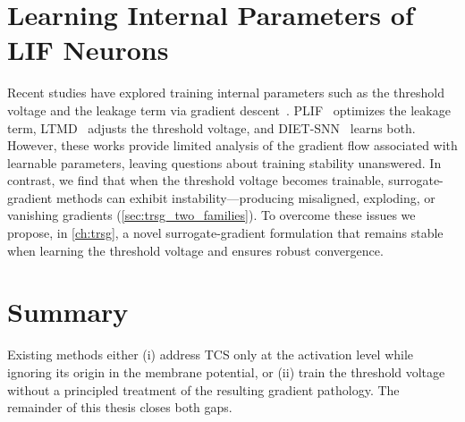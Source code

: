 \section{Learning Internal Parameters of LIF Neurons}
\label{sec:bg_internal}

Recent studies have explored training internal parameters such as the threshold voltage and the leakage term via gradient descent~\cite{fang:2021, wang:2022, rathi:2023}. PLIF~\cite{fang:2021} optimizes the leakage term, LTMD~\cite{wang:2022} adjusts the threshold voltage, and DIET-SNN~\cite{rathi:2023} learns both. However, these works provide limited analysis of the gradient flow associated with learnable parameters, leaving questions about training stability unanswered. In contrast, we find that when the threshold voltage becomes trainable, surrogate-gradient methods can exhibit instability—producing misaligned, exploding, or vanishing gradients (\cref{sec:trsg_two_families}). To overcome these issues we propose, in \cref{ch:trsg}, a novel surrogate-gradient formulation that remains stable when learning the threshold voltage and ensures robust convergence.

\section{Summary}
\label{sec:bg_summary}

Existing methods either (i) address TCS only at the activation level while ignoring its origin in the membrane potential, or (ii) train the threshold voltage without a principled treatment of the resulting gradient pathology. The remainder of this thesis closes both gaps.
